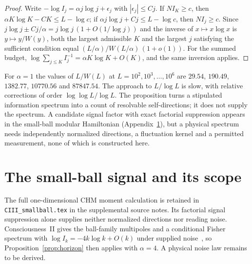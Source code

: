 \documentclass[12pt]{article}
\theoremstyle{definition}
\theoremstyle{remark}
\begin{document}
\begin{proof}
Write $-\log I_j=\alpha j\log j+\epsilon_j$ with $|\epsilon_j|\le Cj$. If $NI_K\ge c$, then $\alpha K\log K-CK\le L-\log c$; if $\alpha j\log j+Cj\le L-\log c$, then $NI_j\ge c$. Since $j\log j\pm Cj/\alpha=j\log j\,(1+O(1/\log j))$ and the inverse of $x\mapsto x\log x$ is $y\mapsto y/W(y)$, both the largest admissible $K$ and the largest $j$ satisfying the sufficient condition equal $(L/\alpha)/W(L/\alpha)\,(1+o(1))$. For the summed budget, $\log\sum_{j\le K}I_j^{-1}=\alpha K\log K+O(K)$, and the same inversion applies.
\end{proof}

For $\alpha=1$ the values of $L/W(L)$ at $L=10^2,10^3,\dots,10^6$ are $29.54$, $190.49$, $1382.77$, $10770.56$ and $87847.54$. The approach to $L/\log L$ is slow, with relative corrections of order $\log\log L/\log L$. The proposition turns a stipulated information spectrum into a count of resolvable self-directions; it does not supply the spectrum. A candidate signal factor with exact factorial suppression appears in the small-ball modular Hamiltonian (Appendix~\ref{app:chm}), but a physical spectrum needs independently normalized directions, a fluctuation kernel and a permitted measurement, none of which is constructed here.

\section{The small-ball signal and its scope}\label{app:chm}
The full one-dimensional CHM moment calculation is retained in
\texttt{CIII\_smallball.tex} in the supplemental source notes.
Its factorial signal suppression alone supplies neither normalized
directions nor reading noise. Consciousness~II gives the ball-family
multipoles and a conditional Fisher spectrum with
$\log I_k=-4k\log k+O(k)$ under supplied noise~\cite{PaperII},
so Proposition~\ref{prop:horizon} then applies with $\alpha=4$.
A physical noise law remains to be derived.

\newpage
{}
\end{document}
